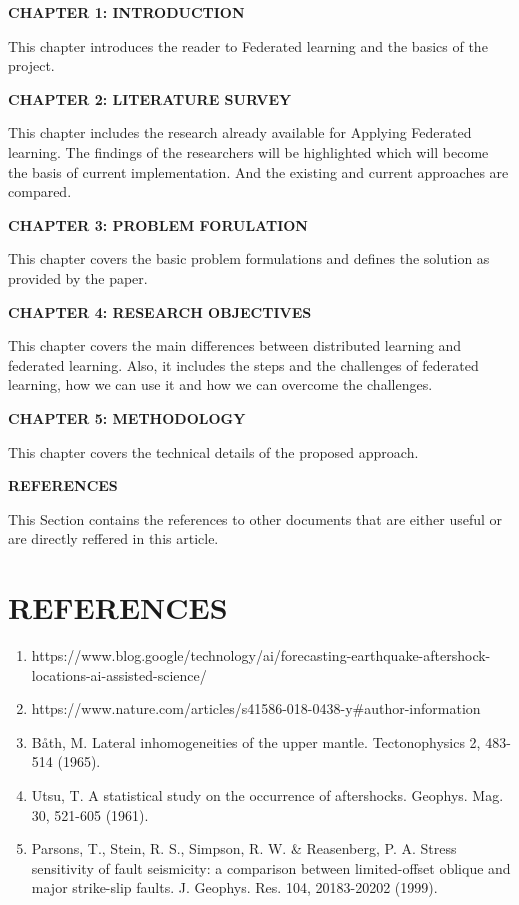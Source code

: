 \documentclass[14pt]{extarticle}
\begin{document}
\textbf{CHAPTER 1: INTRODUCTION }

\par This chapter introduces the reader to Federated learning and the basics of the project.

\textbf{CHAPTER 2: LITERATURE SURVEY}

\par This chapter includes the research already available for Applying Federated learning. The findings of the researchers will be highlighted which will become the basis of current implementation. And the existing and current approaches are compared.

\textbf{CHAPTER 3: PROBLEM FORULATION}

\par This chapter covers the basic problem formulations and defines the solution as provided by the paper.

\textbf{CHAPTER 4: RESEARCH OBJECTIVES}

\par This chapter covers the main differences between distributed learning and federated learning. Also, it includes the steps and the challenges of federated learning, how we can use it and how we can overcome the challenges.

\textbf{CHAPTER 5: METHODOLOGY}

\par This chapter covers the technical details of the proposed approach.

\textbf{REFERENCES}

\par This Section contains the references to other documents that are either useful or are directly reffered in this article.


\newpage
{}
\section*{REFERENCES}
\begin{enumerate}
    \item https://www.blog.google/technology/ai/forecasting-earthquake-aftershock-locations-ai-assisted-science/
    \item https://www.nature.com/articles/s41586-018-0438-y\#author-information
    \item Båth, M. Lateral inhomogeneities of the upper mantle. Tectonophysics 2, 483-514 (1965).
    \item Utsu, T. A statistical study on the occurrence of aftershocks. Geophys. Mag. 30, 521-605 (1961).
    \item Parsons, T., Stein, R. S., Simpson, R. W. \& Reasenberg, P. A. Stress sensitivity of fault seismicity: a comparison between limited-offset oblique and major strike-slip faults. J. Geophys. Res. 104, 20183-20202 (1999).



\end{enumerate}
\end{document}
